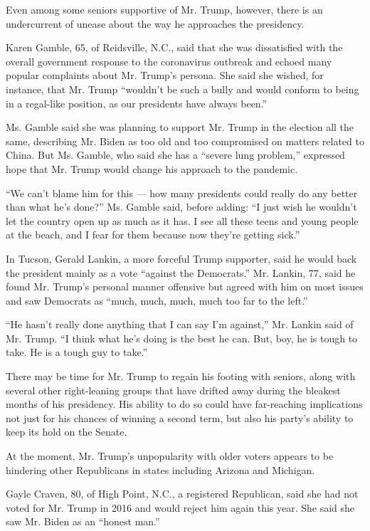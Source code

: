Even among some seniors supportive of Mr. Trump, however, there is an
undercurrent of unease about the way he approaches the presidency.

Karen Gamble, 65, of Reidsville, N.C., said that she was dissatisfied
with the overall government response to the coronavirus outbreak and
echoed many popular complaints about Mr. Trump's persona. She said she
wished, for instance, that Mr. Trump ``wouldn't be such a bully and
would conform to being in a regal-like position, as our presidents have
always been.''

Ms. Gamble said she was planning to support Mr. Trump in the election
all the same, describing Mr. Biden as too old and too compromised on
matters related to China. But Ms. Gamble, who said she has a ``severe
lung problem,'' expressed hope that Mr. Trump would change his approach
to the pandemic.

``We can't blame him for this --- how many presidents could really do
any better than what he's done?'' Ms. Gamble said, before adding: ``I
just wish he wouldn't let the country open up as much as it has. I see
all these teens and young people at the beach, and I fear for them
because now they're getting sick.''

In Tucson, Gerald Lankin, a more forceful Trump supporter, said he would
back the president mainly as a vote ``against the Democrats.'' Mr.
Lankin, 77, said he found Mr. Trump's personal manner offensive but
agreed with him on most issues and saw Democrats as ``much, much, much,
much too far to the left.''

``He hasn't really done anything that I can say I'm against,'' Mr.
Lankin said of Mr. Trump. ``I think what he's doing is the best he can.
But, boy, he is tough to take. He is a tough guy to take.''

There may be time for Mr. Trump to regain his footing with seniors,
along with several other right-leaning groups that have drifted away
during the bleakest months of his presidency. His ability to do so could
have far-reaching implications not just for his chances of winning a
second term, but also his party's ability to keep its hold on the
Senate.

At the moment, Mr. Trump's unpopularity with older voters appears to be
hindering other Republicans in states including Arizona and Michigan.

Gayle Craven, 80, of High Point, N.C., a registered Republican, said she
had not voted for Mr. Trump in 2016 and would reject him again this
year. She said she saw Mr. Biden as an ``honest man.''

